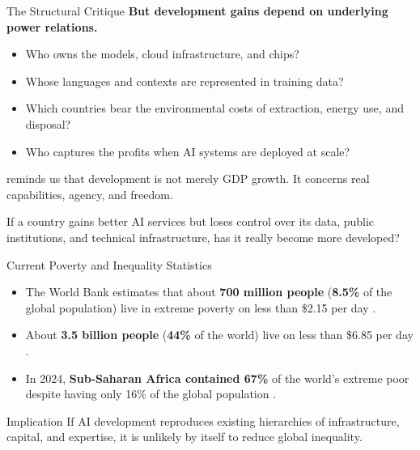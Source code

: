 \documentclass[aspectratio=169,11pt]{beamer}
\begin{document}
\begin{frame}{The Structural Critique}
\textbf{But development gains depend on underlying power relations.}

\vspace{0.2cm}
\begin{itemize}
    \item Who owns the models, cloud infrastructure, and chips?
    \item Whose languages and contexts are represented in training data?
    \item Which countries bear the environmental costs of extraction, energy use, and disposal?
    \item Who captures the profits when AI systems are deployed at scale?
\end{itemize}

\vspace{0.2cm}
\textcite{sen_development_freedom} reminds us that development is not merely GDP growth. It concerns real capabilities, agency, and freedom.

\vspace{0.2cm}
\begin{discussionbox}
\scriptsize
If a country gains better AI services but loses control over its data, public institutions, and technical infrastructure, has it really become more developed?
\end{discussionbox}
\end{frame}

\begin{frame}{Current Poverty and Inequality Statistics}
\begin{itemize}
    \item The World Bank estimates that about \textbf{700 million people} (\textbf{8.5\%} of the global population) live in extreme poverty on less than \$2.15 per day \parencite{worldbank_poverty_planet_2024}.
    \item About \textbf{3.5 billion people} (\textbf{44\%} of the world) live on less than \$6.85 per day \parencite{worldbank_poverty_planet_2024}.
    \item In 2024, \textbf{Sub-Saharan Africa contained 67\%} of the world's extreme poor despite having only 16\% of the global population \parencite{worldbank_poverty_planet_2024}.
\end{itemize}

\begin{alertblock}{Implication}
If AI development reproduces existing hierarchies of infrastructure, capital, and expertise, it is unlikely by itself to reduce global inequality.
\end{alertblock}
\end{frame}
\end{document}
